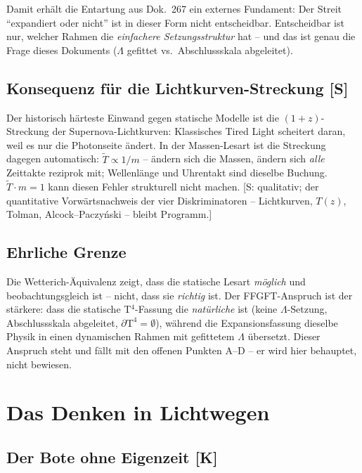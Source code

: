 Damit erhält die Entartung aus Dok.~267 ein externes Fundament:
Der Streit \enquote{expandiert oder nicht} ist in dieser Form nicht
entscheidbar. Entscheidbar ist nur, welcher Rahmen die
\emph{einfachere Setzungsstruktur} hat -- und das ist genau die
Frage dieses Dokuments ($\Lambda$ gefittet vs.\ Abschlussskala
abgeleitet).

\section{Konsequenz für die Lichtkurven-Streckung [S]}

Der historisch härteste Einwand gegen statische Modelle ist die
$(1+z)$-Streckung der Supernova-Lichtkurven: Klassisches
Tired Light scheitert daran, weil es nur die Photonseite ändert.
In der Massen-Lesart ist die Streckung dagegen automatisch:
$\tilde T \propto 1/m$ -- ändern sich die Massen, ändern sich
\emph{alle} Zeittakte reziprok mit; Wellenlänge und Uhrentakt sind
dieselbe Buchung. $\tilde T \cdot m = 1$ kann diesen Fehler
strukturell nicht machen. [S: qualitativ; der quantitative
Vorwärtsnachweis der vier Diskriminatoren -- Lichtkurven, $T(z)$,
Tolman, Alcock--Paczyński -- bleibt Programm.]

\section{Ehrliche Grenze}

Die Wetterich-Äquivalenz zeigt, dass die statische Lesart
\emph{möglich} und beobachtungsgleich ist -- nicht, dass sie
\emph{richtig} ist. Der FFGFT-Anspruch ist der stärkere: dass die
statische T$^4$-Fassung die \emph{natürliche} ist (keine
$\Lambda$-Setzung, Abschlussskala abgeleitet,
$\partial\text{T}^4 = \emptyset$), während die Expansionsfassung
dieselbe Physik in einen dynamischen Rahmen mit gefittetem
$\Lambda$ übersetzt. Dieser Anspruch steht und fällt mit den
offenen Punkten A--D -- er wird hier behauptet, nicht bewiesen.

\chapter{Das Denken in Lichtwegen}

\section{Der Bote ohne Eigenzeit [K]}

